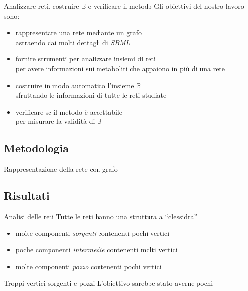 \documentclass[8pt]{beamer}
\begin{document}
\begin{frame}{Analizzare reti, costruire $\mathbb{B}$ e verificare il
    metodo}
Gli obiettivi del nostro lavoro sono:
\begin{itemize}
\item<1-> rappresentare una rete mediante un grafo\\
  \footnotesize{astraendo dai molti dettagli di \emph{SBML}}
\item<2-> fornire strumenti per analizzare insiemi di reti\\
  \footnotesize{per avere informazioni sui metaboliti che appaiono in
    pi\`u di una rete}
\item<3-> costruire in modo automatico l'insieme $\mathbb{B}$\\
  \footnotesize{sfruttando le informazioni di tutte le reti studiate}
\item<4-> verificare se il metodo \`e accettabile\\
  \footnotesize{per misurare la validit\`a di $\mathbb{B}$}
\end{itemize}
\end{frame}

\subsection{Metodologia}

\begin{frame}{Rappresentazione della rete con grafo}
\end{frame}

\subsection{Risultati}

\begin{frame}{Analisi delle reti}
Tutte le reti hanno una struttura a ``clessidra'':
\begin{itemize}
\item molte componenti \emph{sorgenti} contenenti pochi vertici
\item poche componenti \emph{intermedie} contenenti molti vertici
\item molte componenti \emph{pozzo} contenenti pochi vertici
\end{itemize}
\pause
\begin{alertblock}{Troppi vertici sorgenti e pozzi}
  L'obiettivo sarebbe stato averne pochi
\end{alertblock}
\end{frame}
\end{document}
